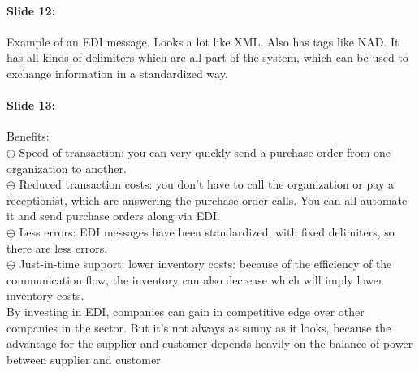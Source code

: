 \documentclass[10pt,a4paper]{report}
\begin{document}
\paragraph{Slide 12:}Example of an EDI message. Looks a lot like XML. Also has tags like NAD. It has all kinds of delimiters which are all part of the system, which can be used to exchange information in a standardized way.

\paragraph{Slide 13:}Benefits:\\
$\oplus$ Speed of transaction: you can very quickly send a purchase order from one organization to another.\\
$\oplus$ Reduced transaction costs: you don't have to call the organization or pay a receptionist, which are answering the purchase order calls. You can all automate it and send purchase orders along via EDI.\\
$\oplus$ Less errors: EDI messages have been standardized, with fixed delimiters, so there are less errors. \\
$\oplus$ Just-in-time support: lower inventory costs: because of the efficiency of the communication flow, the inventory can also decrease which will imply lower inventory costs.\\
By investing in EDI, companies can gain in competitive edge over other companies in the sector.
But it's not always as sunny as it looks, because the advantage for the supplier and customer depends heavily on the balance of power between supplier and customer.
\end{document}
